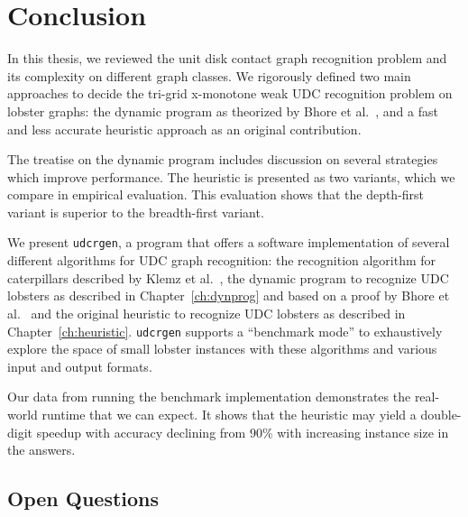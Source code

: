 
\chapter{Conclusion}

In this thesis, we reviewed the unit disk contact graph recognition problem and its complexity on different graph classes. We rigorously defined two main approaches to decide the tri-grid x-monotone weak UDC recognition problem on lobster graphs: the dynamic program as theorized by Bhore et al.~\cite{Bhore2021}, and a fast and less accurate heuristic approach as an original contribution.

The treatise on the dynamic program includes discussion on several strategies which improve performance. The heuristic is presented as two variants, which we compare in empirical evaluation. This evaluation shows that the depth-first variant is superior to the breadth-first variant.

We present \texttt{udcrgen}, a program that offers a software implementation of several different algorithms for UDC graph recognition: the recognition algorithm for caterpillars described by Klemz et al.~\cite{Klemz2015}, the dynamic program to recognize UDC lobsters as described in Chapter~\ref{ch:dynprog} and based on a proof by Bhore et al.~\cite{Bhore2021} and the original heuristic to recognize UDC lobsters as described in Chapter~\ref{ch:heuristic}. \texttt{udcrgen} supports a ``benchmark mode'' to exhaustively explore the space of small lobster instances with these algorithms and various input and output formats.

Our data from running the benchmark implementation demonstrates the real-world runtime that we can expect. It shows that the heuristic may yield a double-digit speedup with accuracy declining from $90\%$ with increasing instance size in the answers.

\section{Open Questions}

